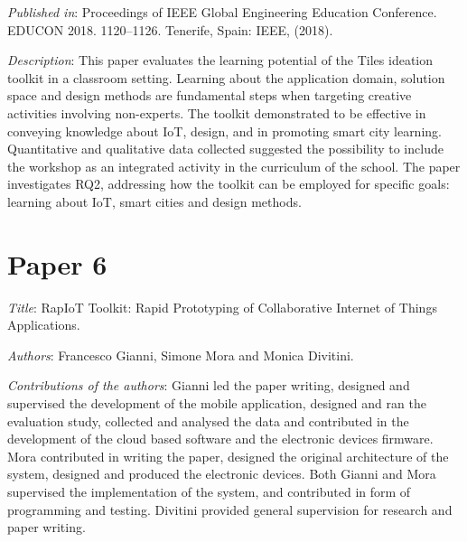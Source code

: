 \emph{Published in}: Proceedings of IEEE Global Engineering Education Conference. EDUCON 2018. 1120--1126. Tenerife, Spain: IEEE, (2018).

\emph{Description}: This paper evaluates the learning potential of the Tiles ideation toolkit in a classroom setting. Learning about the application domain, solution space and design methods are fundamental steps when targeting creative activities involving non-experts. The toolkit demonstrated to be effective in conveying knowledge about IoT, design, and in promoting smart city learning. Quantitative and qualitative data collected suggested the possibility to include the workshop as an integrated activity in the curriculum of the school.
The paper investigates RQ2, addressing how the toolkit can be employed for specific goals: learning about IoT, smart cities and design methods.


\section[P6: RapIoT Toolkit: Rapid Prototyping of Collaborative Internet of Things Applications.][Paper 6]{Paper 6}
\label{paper-6}

\emph{Title}: RapIoT Toolkit: Rapid Prototyping of Collaborative Internet of Things Applications.

\emph{Authors}: Francesco Gianni, Simone Mora and Monica Divitini.

\emph{Contributions of the authors}: Gianni led the paper writing, designed and supervised the development of the mobile application, designed and ran the evaluation study, collected and analysed the data and contributed in the development of the cloud based software and the electronic devices firmware. Mora contributed in writing the paper, designed the original architecture of the system, designed and produced the electronic devices. Both Gianni and Mora supervised the implementation of the system, and contributed in form of programming and testing. Divitini provided general supervision for research and paper writing.

